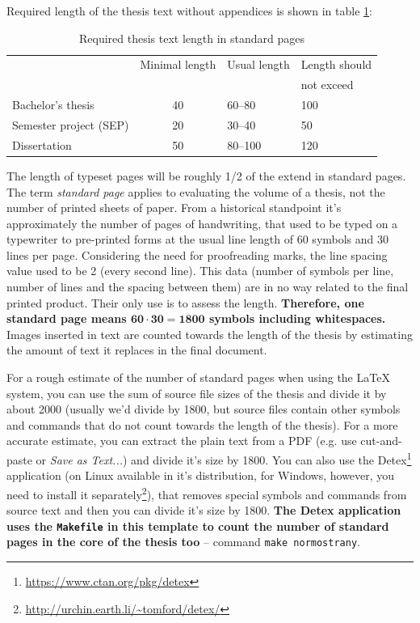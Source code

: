 Required length of the thesis text without appendices is shown in table \ref{rozsah}: 

\begin{table}[hbt]
\centering
\caption{Required thesis text length in standard pages}
\label{rozsah}
\begin{tabular}{|l|c|l|l|}
\hline
 & Minimal length & Usual length & Length should \\
 &  &  & not exceed  \\ \hline
Bachelor's thesis & 40 & 60--80 & 100 \\ \hline
Semester project (SEP) & 20 & 30--40 & 50 \\ \hline
Dissertation & 50 & 80--100 & 120 \\ \hline
\end{tabular}
\end{table}

The length of typeset pages will be roughly 1/2 of the extend in standard pages. The term {\it standard page} applies to evaluating the volume of a thesis, not the number of printed sheets of paper. From a historical standpoint it's approximately the number of pages of handwriting, that used to be typed on a typewriter to pre-printed forms at the usual line length of 60 symbols and 30 lines per page. Considering the need for proofreading marks, the line spacing value used to be 2 (every second line). This data (number of symbols per line, number of lines and the spacing between them) are in no way related to the final printed product. Their only use is to assess the length. \textbf{Therefore, one standard page means $\mathbf{60\cdot 30 = 1800}$ symbols including whitespaces.} Images inserted in text are counted towards the length of the thesis by estimating the amount of text it replaces in the final document.

For a rough estimate of the number of standard pages when using the \LaTeX{} system, you can use the sum of source file sizes of the thesis and divide it by about 2000 (usually we'd divide by 1800, but source files contain other symbols and commands that do not count towards the length of the thesis). For a more accurate estimate, you can extract the plain text from a PDF (e.g. use cut-and-paste or {\it Save as Text...}) and divide it's size by 1800. You can also use the Detex\footnote{\url{https://www.ctan.org/pkg/detex}} application (on Linux available in it's distribution, for Windows, however, you need to install it separately\footnote{\url{http://urchin.earth.li/~tomford/detex/}}), that removes special symbols and commands from source text and then you can divide it's size by 1800. \textbf{The Detex application uses the \texttt{Makefile} in this template to count the number of standard pages in the core of the thesis too} -- command \verb|make normostrany|.

